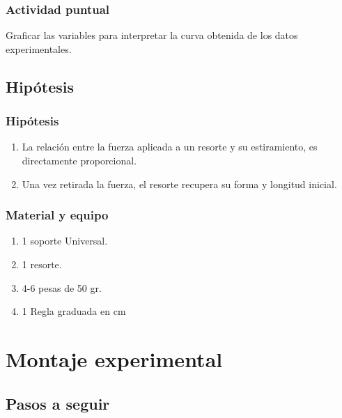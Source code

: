 \documentclass[14pt]{beamer}
\begin{document}
\begin{frame}
\frametitle{Actividad puntual}
Graficar las variables para interpretar la curva obtenida de los datos experimentales.
\end{frame}

\subsection{Hipótesis}

\begin{frame}
\frametitle{Hipótesis}
\begin{enumerate}[<+->]
\item La relación entre la fuerza aplicada a un resorte y su estiramiento, es directamente proporcional.
\item Una vez retirada la fuerza, el resorte recupera su forma y longitud inicial.
\end{enumerate}
\end{frame}

\begin{frame}
\frametitle{Material y equipo}
\begin{enumerate}[<+->]
\item 1 soporte Universal.
\item 1 resorte.
\item 4-6 pesas de 50 gr.
\item 1 Regla graduada en cm
\end{enumerate}
\end{frame}

\section{Montaje experimental}
\subsection{Pasos a seguir}
\end{document}
